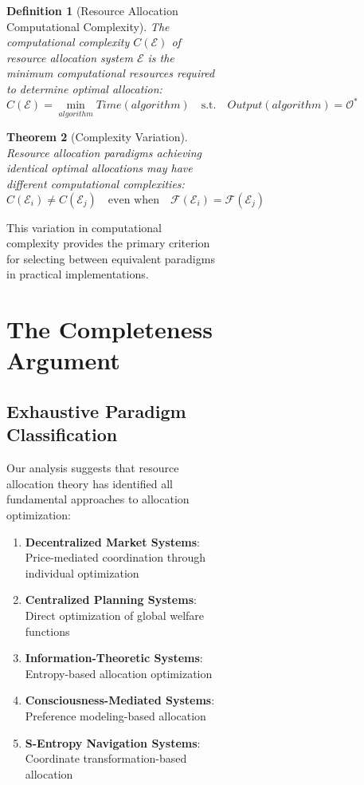 \documentclass[12pt,a4paper]{article}
\newtheorem{theorem}{Theorem}
\newtheorem{definition}[theorem]{Definition}
\begin{document}
\begin{figure}[H]
\begin{figure}[H]
\begin{figure}[H]
\begin{definition}[Resource Allocation Computational Complexity]
The computational complexity $C(\mathcal{E})$ of resource allocation system $\mathcal{E}$ is the minimum computational resources required to determine optimal allocation:
\begin{equation}
C(\mathcal{E}) = \min_{algorithm} Time(algorithm) \quad \text{s.t.} \quad Output(algorithm) = \mathcal{O}^*
\end{equation}
\end{definition}

\begin{theorem}[Complexity Variation]
Resource allocation paradigms achieving identical optimal allocations may have different computational complexities:
\begin{equation}
C(\mathcal{E}_i) \neq C(\mathcal{E}_j) \quad \text{even when} \quad \mathcal{F}(\mathcal{E}_i) = \mathcal{F}(\mathcal{E}_j)
\end{equation}
\end{theorem}

This variation in computational complexity provides the primary criterion for selecting between equivalent paradigms in practical implementations.

\section{The Completeness Argument}

\subsection{Exhaustive Paradigm Classification}

Our analysis suggests that resource allocation theory has identified all fundamental approaches to allocation optimization:

\begin{enumerate}
\item \textbf{Decentralized Market Systems}: Price-mediated coordination through individual optimization
\item \textbf{Centralized Planning Systems}: Direct optimization of global welfare functions
\item \textbf{Information-Theoretic Systems}: Entropy-based allocation optimization
\item \textbf{Consciousness-Mediated Systems}: Preference modeling-based allocation
\item \textbf{S-Entropy Navigation Systems}: Coordinate transformation-based allocation
\end{enumerate}


\end{figure}
\end{figure}
\end{figure}
\end{document}
